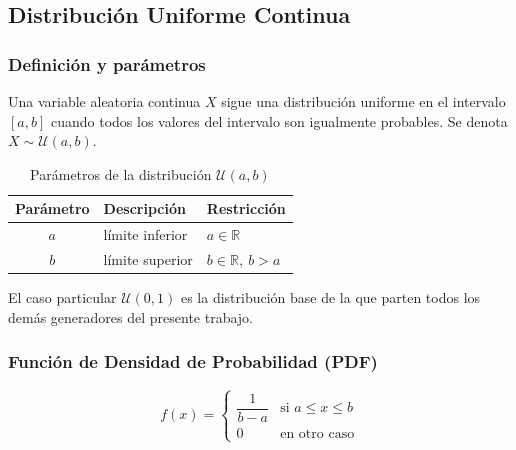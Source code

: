 

\subsection{Distribución Uniforme Continua}

\subsubsection{Definición y parámetros}

Una variable aleatoria continua $X$ sigue una distribución uniforme en el intervalo $[a, b]$
cuando todos los valores del intervalo son igualmente probables. Se denota $X \sim \mathcal{U}(a, b)$.

\begin{table}[h!]
\centering
\begin{tabular}{|c|l|l|}
\hline
\textbf{Parámetro} & \textbf{Descripción} & \textbf{Restricción} \\
\hline
$a$ & límite inferior & $a \in \mathbb{R}$ \\
$b$ & límite superior & $b \in \mathbb{R},\ b > a$ \\
\hline
\end{tabular}
\caption{Parámetros de la distribución $\mathcal{U}(a,b)$}
\end{table}

El caso particular $\mathcal{U}(0, 1)$ es la distribución base de la que parten todos los
demás generadores del presente trabajo.

\subsubsection{Función de Densidad de Probabilidad (PDF)}

\begin{equation}
f(x) =
\begin{cases}
\dfrac{1}{b - a} & \text{si } a \leq x \leq b \\[6pt]
0 & \text{en otro caso}
\end{cases}
\end{equation}

